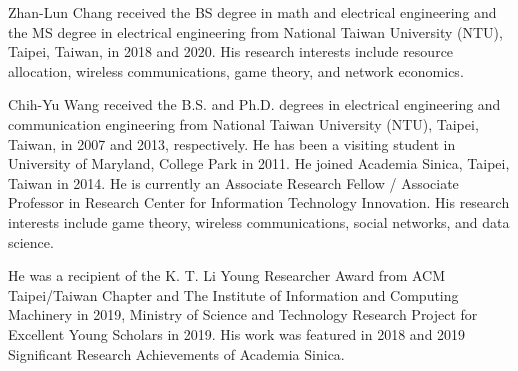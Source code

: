 \documentclass[10pt,journal, compsoc]{IEEEtran}
\begin{document}
\begin{IEEEbiography}{Zhan-Lun Chang}  received the BS degree in math and electrical engineering and the MS degree in electrical engineering from National Taiwan University (NTU), Taipei, Taiwan, in 2018 and 2020. His research interests include resource allocation, wireless communications, game theory, and network economics.
\end{IEEEbiography}
%
\begin{IEEEbiography}{Chih-Yu Wang} received the B.S. and Ph.D. degrees in electrical engineering and communication engineering from National Taiwan University (NTU), Taipei, Taiwan, in 2007 and 2013, respectively. He has been a visiting student in University of Maryland, College Park in 2011. He joined Academia Sinica, Taipei, Taiwan in 2014. He is currently an Associate Research Fellow / Associate Professor in Research Center for Information Technology Innovation. His research interests include game theory, wireless communications, social networks, and data science.

He was a recipient of the K. T. Li Young Researcher Award from ACM Taipei/Taiwan Chapter and The Institute of Information and Computing Machinery in 2019, Ministry of Science and Technology Research Project for Excellent Young Scholars in 2019. His work was featured in 2018 and 2019 Significant Research Achievements of Academia Sinica.
\end{IEEEbiography}
%
\end{document}
